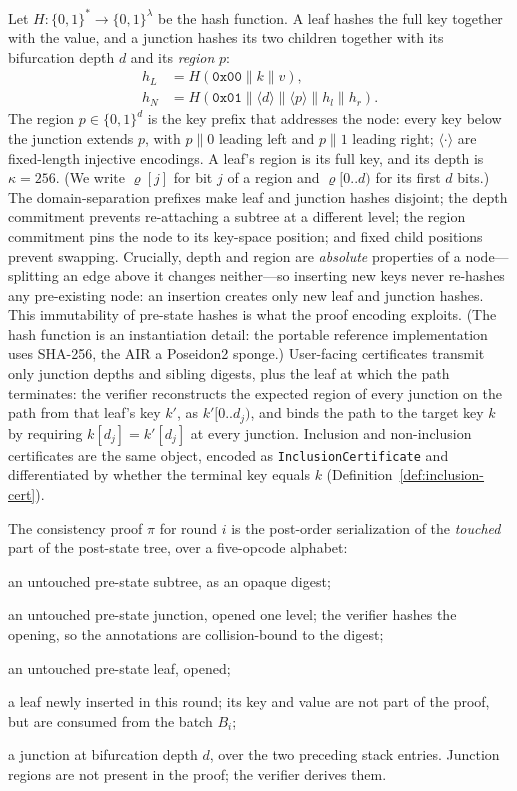 \documentclass[twocolumn]{article}
\begin{document}
Let $H \colon \{0,1\}^{*} \to \{0,1\}^{\lambda}$ be the hash function. A leaf hashes the full key together with the value, and a junction hashes its two children together with its bifurcation depth $d$ and its \emph{region} $p$:
\begin{align*}
  h_L &= H(\texttt{0x00} \parallel k \parallel v),\\
  h_N &= H(\texttt{0x01} \parallel \langle d\rangle \parallel \langle p\rangle \parallel h_l \parallel h_r).
\end{align*}
The region $p \in \{0,1\}^d$ is the key prefix that addresses the node: every key below the junction extends $p$, with $p\|0$ leading left and $p\|1$ leading right; $\langle\cdot\rangle$ are fixed-length injective encodings. A leaf's region is its full key, and its depth is $\kappa = 256$. (We write $\varrho[j]$ for bit $j$ of a region and $\varrho[0..d)$ for its first $d$ bits.) The domain-separation prefixes make leaf and junction hashes disjoint; the depth commitment prevents re-attaching a subtree at a different level; the region commitment pins the node to its key-space position; and fixed child positions prevent swapping. Crucially, depth and region are \emph{absolute} properties of a node---splitting an edge above it changes neither---so inserting new keys never re-hashes any pre-existing node: an insertion creates only new leaf and junction hashes. This immutability of pre-state hashes is what the proof encoding exploits. (The hash function is an instantiation detail: the portable reference implementation uses SHA-256, the AIR a Poseidon2 sponge.) User-facing certificates transmit only junction depths and sibling digests, plus the leaf at which the path terminates: the verifier reconstructs the expected region of every junction on the path from that leaf's key $k'$, as $k'[0..d_j)$, and binds the path to the target key $k$ by requiring $k[d_j]=k'[d_j]$ at every junction. Inclusion and non-inclusion certificates are the same object, encoded as \texttt{InclusionCertificate} and differentiated by whether the terminal key equals $k$ (Definition~\ref{def:inclusion-cert}).

The consistency proof $\pi$ for round $i$ is the post-order serialization of the \emph{touched} part of the post-state tree, over a five-opcode alphabet:
\begin{description}[nosep]
  \item[$S(c)$:] an untouched pre-state subtree, as an opaque digest;
  \item[$O(d', p', c_l, c_r)$:] an untouched pre-state junction, opened one level; the verifier hashes the opening, so the annotations are collision-bound to the digest;
  \item[$O_L(k', v')$:] an untouched pre-state leaf, opened;
  \item[$L$:] a leaf newly inserted in this round; its key and value are not part of the proof, but are consumed from the batch $B_i$;
  \item[$N(d)$:] a junction at bifurcation depth $d$, over the two preceding stack entries. Junction regions are not present in the proof; the verifier derives them.
\end{description}
\end{document}
